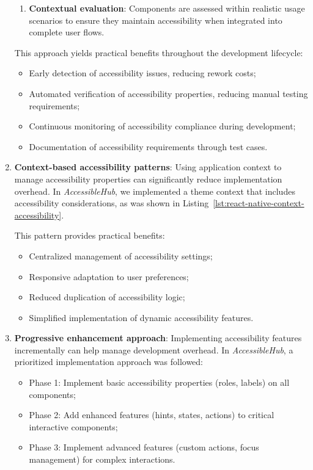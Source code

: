 \begin{enumerate}
\begin{enumerate}
        \item \textbf{Contextual evaluation}: Components are assessed within realistic usage scenarios to ensure they maintain accessibility when integrated into complete user flows.
    \end{enumerate}
    
    This approach yields practical benefits throughout the development lifecycle:
    \begin{itemize}
        \item Early detection of accessibility issues, reducing rework costs;
        \item Automated verification of accessibility properties, reducing manual testing requirements;
        \item Continuous monitoring of accessibility compliance during development;
        \item Documentation of accessibility requirements through test cases.
    \end{itemize}
    
    \item \textbf{Context-based accessibility patterns}: Using application context to manage accessibility properties can significantly reduce implementation overhead. In \textit{AccessibleHub}, we implemented a theme context that includes accessibility considerations, as was shown in Listing~\ref{lst:react-native-context-accessibility}.
    
    This pattern provides practical benefits:
    \begin{itemize}
        \item Centralized management of accessibility settings;
        \item Responsive adaptation to user preferences;
        \item Reduced duplication of accessibility logic;
        \item Simplified implementation of dynamic accessibility features.
    \end{itemize}
    
    \item \textbf{Progressive enhancement approach}: Implementing accessibility features incrementally can help manage development overhead. In \textit{AccessibleHub}, a prioritized implementation approach was followed:
    \begin{itemize}
        \item Phase 1: Implement basic accessibility properties (roles, labels) on all components;
        \item Phase 2: Add enhanced features (hints, states, actions) to critical interactive components;
        \item Phase 3: Implement advanced features (custom actions, focus management) for complex interactions.
    \end{itemize}
    

\end{enumerate}
